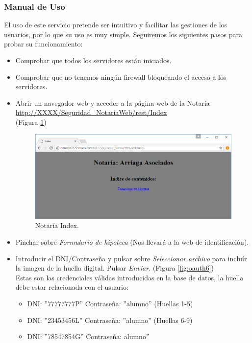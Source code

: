 \documentclass[a4,12pt,onecolum]{article}
\begin{document}

\subsubsection{Manual de Uso}

El uso de este servicio pretende ser intuitivo y facilitar las gestiones de los usuarios, por lo que su uso es muy simple. Seguiremos los siguientes pasos para probar su funcionamiento:

\begin{itemize}
	\item Comprobar que todos los servidores están iniciados.

	\item Comprobar que no tenemos ningún firewall bloqueando el acceso a los servidores.

	\item Abrir un navegador web y acceder a la página web de la Notaría \\
		\url{http://XXXX/Seguridad\_NotariaWeb/rest/Index}	\\
		(Figura \ref{fig:oauth5})

\begin{figure}[htbp]
\centering
\includegraphics[width=1.1\textwidth]{./images/oauth/notaria_index.png}
\caption{Notaría Index.}
\label{fig:oauth5}
\end{figure}

	\item Pinchar sobre \emph{Formulario de hipoteca} (Nos llevará a la web de identificación).

	\item Introducir el DNI/Contraseña y pulsar sobre \emph{Seleccionar archivo} para incluír la imagen de la 		huella digital. Pulsar \emph{Enviar}. (Figura \ref{fig:oauth6}) \\
	Estas son las credenciales válidas introducidas en la base de datos, la huella debe estar relacionada con el usuario:
	\begin{itemize}
		\item DNI: ''77777777P'' Contraseña: ''alumno'' (Huellas 1-5)
		\item DNI: ''23453456L'' Contraseña: ''alumno''	(Huellas 6-9)
		\item DNI: ''78547854G'' Contraseña: alumno''
	\end{itemize}


\end{itemize}
\end{document}
